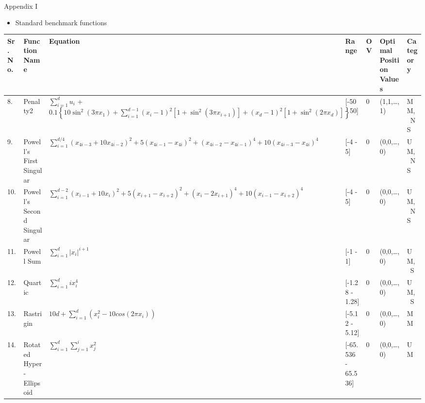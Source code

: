 \documentclass [9pt,times] {beamer}
\begin{document}
\begin{frame}[fragile]{Appendix I}
\begin{itemize}
\item Standard benchmark functions
\end{itemize}
\begin{table}
\scriptsize
\renewcommand{\arraystretch}{1}
\vspace{-0.25cm}
  \begin{tabular}{p{0.06in} p{0.32in} p{1.5in} p{0.4in} p{0.08in} p{0.34in} p{0.34in}}
    \hline
\textbf{Sr. No.}  &\textbf{Function Name}	&	 \textbf{Equation}	&			\textbf{Range }	 & \textbf{OV} &\textbf{Optimal Position Values }&\textbf{Category}\\
\hline
8.	&	Penalty2	&	 $\sum_{i=1}^{d} u_i $ + $ 0.1 \left\{ 10 \sin ^ 2 ( 3 \pi x_1 ) + \sum_{i=1}^{d-1} ( x_i  - 1 ) ^ 2   [  1  +  \sin^2  ( 3 \pi x_{i+1} ) ]  +  ( x_d - 1 ) ^ 2 [ 1 + \sin ^ 2 ( 2 \pi x_d ) ] \right\} $ 	&	[-50 - 50]		& 0	&	  (1,1,\dots,1) &MM,\ NS\\
9.	&	Powell's First Singular	&	$ \sum_{i=1}^{d/4} (x_{4i-3} + 10x_{4i-2})^2 + 5(x_{4i-1} - x_{4i})^2 + (x_{4i-2} - x_{4i-1})^4 + 10 (x_{4i-3} - x_{4i})^4 $	&	[-4 - 5]	&	0	 &	(0,0,\dots,0)& UM,\ NS\\
10.	&	Powell's Second Singular	&	$ \sum_{i=1}^{d-2} (x_{i-1} + 10x_i)^2 + 5 (x_{i+1} - x_{i+2})^2 + (x_{i} - 2x_{i+1})^4 + 10(x_{i-1} - x_{i+2})^4 $ &	[-4 - 5]	&	0	&	 (0,0,\dots,0) & UM,\ NS\\
11.	&	Powell Sum	&	$  \sum_{i=1}^{d} |x_i|^{i+1} $ &	[-1 - 1]	&	0	 &	(0,0,\dots,0)	& UM,\ S\\
12.	&	Quartic	&	$ \sum_{i=1}^{d} i x_i^4 $	&	[-1.28 - 1.28]	&	0	&	(0,0,\dots,0)	& UM,\ S\\
13.	&	Rastrigin	&	$ 10d + \sum_{i=1}^d (x_i^2 - 10cos(2\pi x_i))$	&	[-5.12 - 5.12]	&	0	&	 (0,0,\dots,0)	& MM\\
14.	&	Rotated Hyper-Ellipsoid	&	$  \sum_{i=1}^{d} \sum_{j=1}^{i} x_j^2 $ &	[-65.536 - 65.536] 	&	0	&	 (0,0,\dots,0)	& UM\\

\end{tabular}
\end{table}

\end{frame}
\end{document}
